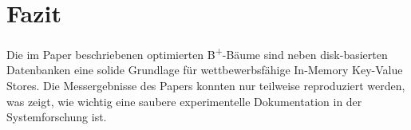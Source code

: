 \documentclass[conference]{IEEEtran}
\begin{document}
\section{Fazit}

Die im Paper beschriebenen optimierten B\textsuperscript{+}-Bäume sind neben disk-basierten Datenbanken eine solide Grundlage für wettbewerbsfähige In-Memory Key-Value Stores. Die Messergebnisse des Papers konnten nur teilweise reproduziert werden, was
zeigt, wie wichtig eine saubere experimentelle Dokumentation in der Systemforschung ist.

\nocite{*}


\end{document}
